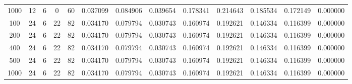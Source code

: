 \begin{table}[h]
\begin{tabular}{ccccccccccccc}
1000 & 12 & 6 & 0 & 60 & 0.037099 & 0.084906 & 0.039654 & 0.178341 & 0.214643 & 0.185534 & 0.172149 & 0.000000 \\
100 & 24 & 6 & 22 & 82 & 0.034170 & 0.079794 & 0.030743 & 0.160974 & 0.192621 & 0.146334 & 0.116399 & 0.000000 \\
200 & 24 & 6 & 22 & 82 & 0.034170 & 0.079794 & 0.030743 & 0.160974 & 0.192621 & 0.146334 & 0.116399 & 0.000000 \\
400 & 24 & 6 & 22 & 82 & 0.034170 & 0.079794 & 0.030743 & 0.160974 & 0.192621 & 0.146334 & 0.116399 & 0.000000 \\
500 & 24 & 6 & 22 & 82 & 0.034170 & 0.079794 & 0.030743 & 0.160974 & 0.192621 & 0.146334 & 0.116399 & 0.000000 \\
1000 & 24 & 6 & 22 & 82 & 0.034170 & 0.079794 & 0.030743 & 0.160974 & 0.192621 & 0.146334 & 0.116399 & 0.000000 \\
\bottomrule
\end{tabular}
\end{table}
